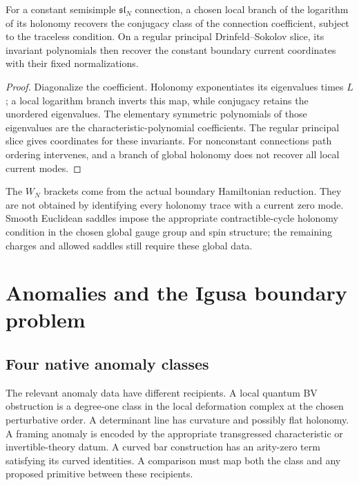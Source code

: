 \begin{proposition}
For a constant semisimple $\mathfrak{sl}_N$ connection, a chosen local
branch of the logarithm of its holonomy recovers the conjugacy class of
the connection coefficient, subject to the traceless condition. On a
regular principal Drinfeld--Sokolov slice, its invariant polynomials
then recover the constant boundary current coordinates with their fixed
normalizations.
\end{proposition}
\begin{proof}
Diagonalize the coefficient. Holonomy exponentiates its eigenvalues times
$L$; a local logarithm branch inverts this map, while conjugacy retains
the unordered eigenvalues. The elementary symmetric polynomials of those
eigenvalues are the characteristic-polynomial coefficients. The regular
principal slice gives coordinates for these invariants. For nonconstant
connections path ordering intervenes, and a branch of global holonomy does
not recover all local current modes.
\end{proof}

The $W_N$ brackets come from the actual boundary Hamiltonian reduction.
They are not obtained by identifying every holonomy trace with a current
zero mode. Smooth Euclidean saddles impose the appropriate contractible-cycle
holonomy condition in the chosen global gauge group and spin structure;
the remaining charges and allowed saddles still require these global data.

\chapter{Anomalies and the Igusa boundary problem}

\section{Four native anomaly classes}
The relevant anomaly data have different recipients. A local quantum BV
obstruction is a degree-one class in the local deformation complex at the
chosen perturbative order. A determinant line has curvature and possibly
flat holonomy. A framing anomaly is encoded by the appropriate transgressed
characteristic or invertible-theory datum. A curved bar construction has
an arity-zero term satisfying its curved identities. A comparison must
map both the class and any proposed primitive between these recipients.

